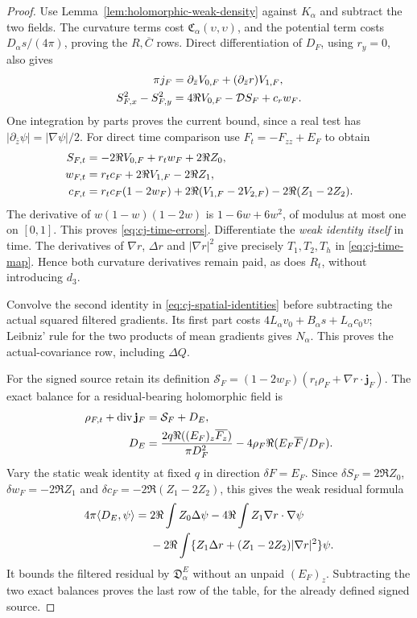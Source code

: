 \begin{proof}
Use Lemma~\ref{lem:holomorphic-weak-density} against $K_\alpha$ and
subtract the two fields. The curvature terms cost
$\mathfrak C_\alpha(\upsilon,\upsilon)$, and the potential term costs
$D_\alpha s/(4\pi)$, proving the $R,\overline C$ rows.
Direct differentiation of $D_F$, using $r_y=0$, also gives
\begin{align}
 \pi j_F&=\partial_{\bar z}V_{0,F}+(\partial_{\bar z}r)V_{1,F},\notag\\
 S_{F,x}^2-S_{F,y}^2&=4\Re V_{0,F}-\mathcal D S_F+c_rw_F.
 \label{eq:cj-spatial-identities}
\end{align}
One integration by parts proves the current bound, since a real test has
$|\partial_{\bar z}\psi|=|\nabla\psi|/2$.
For direct time comparison use $F_t=-F_{zz}+E_F$ to obtain
\begin{align}
 S_{F,t}&=-2\Re V_{0,F}+r_tw_F+2\Re Z_0,\notag\\
 w_{F,t}&=r_tc_F+2\Re V_{1,F}-2\Re Z_1,\notag\\
 c_{F,t}&=r_tc_F(1-2w_F)+2\Re(V_{1,F}-2V_{2,F})
                                  -2\Re(Z_1-2Z_2).
 \label{eq:cj-direct-time}
\end{align}
The derivative of $w(1-w)(1-2w)$ is $1-6w+6w^2$, of modulus at
most one on $[0,1]$. This proves \eqref{eq:cj-time-errors}.
Differentiate the \emph{weak identity itself} in time. The derivatives of
$\nabla r$, $\Delta r$ and $|\nabla r|^2$ give precisely $T_1,T_2,T_h$
in \eqref{eq:cj-time-map}. Hence both curvature derivatives remain paid,
as does $R_t$, without introducing $d_3$.

Convolve the second identity in \eqref{eq:cj-spatial-identities} before
subtracting the actual squared filtered gradients. Its first part costs
$4L_\alpha v_0+B_\alpha s+L_\alpha c_0\upsilon$; Leibniz' rule for
the two products of mean gradients gives $N_\alpha$. This proves the
actual-covariance row, including $\Delta Q$.

For the signed source retain its definition
$\mathcal S_F=(1-2w_F)(r_t\rho_F+\nabla r\cdot\mathbf j_F)$.
The exact balance for a residual-bearing holomorphic field is
\begin{align}
 \rho_{F,t}+\operatorname{div}\mathbf j_F&=\mathcal S_F+D_E,\notag\\
 D_E&=\frac{2q\Re((E_F)_z\overline{F_z})}{\pi D_F^2}
          -4\rho_F\Re(E_F\overline F/D_F).
 \label{eq:cj-point-residual}
\end{align}
Vary the static weak identity at fixed $q$ in direction $\delta F=E_F$.
Since $\delta S_F=2\Re Z_0$, $\delta w_F=-2\Re Z_1$ and
$\delta c_F=-2\Re(Z_1-2Z_2)$, this gives the weak residual formula
\begin{align}
 4\pi\langle D_E,\psi\rangle
 ={}&2\Re\int Z_0\Delta\psi-4\Re\int Z_1\nabla r\cdot\nabla\psi\notag\\
 &-2\Re\int\{Z_1\Delta r+(Z_1-2Z_2)|\nabla r|^2\}\psi.
 \label{eq:cj-weak-residual}
\end{align}
It bounds the filtered residual by $\mathfrak D^E_\alpha$ without an
unpaid $(E_F)_z$. Subtracting the two exact balances proves the last
row of the table, for the already defined signed source.


\end{proof}
